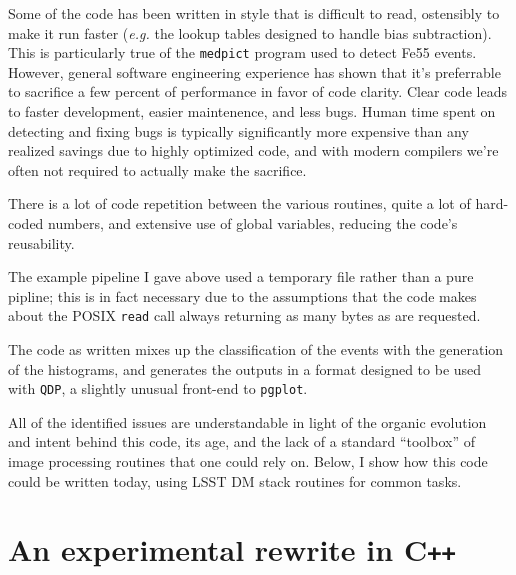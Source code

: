 \documentclass[12pt]{article}
\newcommand{\CPP}{C\texttt{++}\xspace}  %
\begin{document}
Some of the code has been written in style that is difficult to read, ostensibly to
make it run faster (\textit{e.g.} the lookup tables designed to handle bias
subtraction). This is particularly true of the \texttt{medpict} program used to
detect Fe55 events. However, general software engineering experience has shown that it's
preferrable to sacrifice a few percent of performance in favor of code clarity. Clear code
leads to faster development, easier maintenence, and less bugs. Human time
spent on detecting and fixing bugs is typically significantly more expensive than any 
realized savings due to highly optimized code, and with modern compilers we're often not
required to actually make the sacrifice. 

There is a lot of code repetition between the various routines, quite a lot of hard-coded numbers, and
extensive use of global variables, reducing the code's reusability.

The example pipeline I gave above used a temporary file rather than a pure pipline; this is in fact necessary
due to the assumptions that the code makes about the POSIX \texttt{read} call always returning as many bytes
as are requested.

The code as written mixes up the classification of the events with the generation of the histograms, and
generates the outputs in a format designed to be used
with \texttt{QDP}, a slightly unusual front-end to \texttt{pgplot}.

All of the identified issues are understandable in light of the organic
evolution and intent behind this code, its age, and the lack of a standard
``toolbox'' of image processing routines that one could rely on.  Below, I
show how this code could be written today, using LSST DM stack routines for
common tasks.

\section{An experimental rewrite in \CPP}
\end{document}
